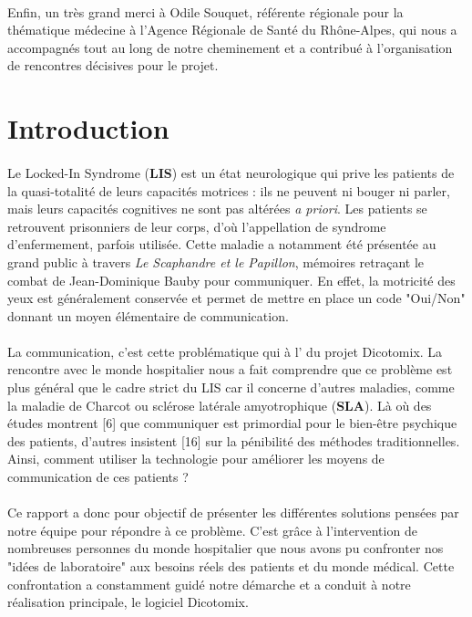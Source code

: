 \documentclass[11pt,a4paper]{article}
\theoremstyle{plain}
\theoremstyle{definition}
\begin{document}
\paragraph{}Enfin, un très grand merci à Odile Souquet, référente régionale pour la thématique médecine à l'Agence Régionale de Santé du Rhône-Alpes, qui nous a accompagnés tout au long de notre cheminement et a contribué à l'organisation de rencontres décisives pour le projet.

\newpage

\tableofcontents

\newpage
\section{Introduction}

\paragraph{} Le Locked-In Syndrome (\textbf{LIS}) est un état neurologique qui prive les patients de la quasi-totalité de leurs capacités motrices : ils ne peuvent ni bouger ni parler,
mais leurs capacités cognitives ne sont pas altérées \textit{a priori}. Les patients se retrouvent prisonniers de leur corps, d'où l'appellation de syndrome d'enfermement, parfois utilisée.
Cette maladie a notamment été présentée au grand public à travers \textit{Le Scaphandre et le Papillon}, mémoires retraçant le combat de Jean-Dominique Bauby pour communiquer. 
En effet, la motricité des yeux est généralement conservée et permet de mettre en place un code "Oui/Non" donnant un moyen élémentaire de communication.

\paragraph{} La communication, c'est cette problématique qui à l' du projet Dicotomix. La rencontre avec le monde hospitalier nous a fait comprendre que ce problème est plus général 
que le cadre strict du LIS car il concerne d'autres maladies, comme la maladie de Charcot ou sclérose latérale amyotrophique (\textbf{SLA}). Là où des études montrent [6] que communiquer est primordial pour le bien-être psychique des patients, d'autres insistent [16] sur la pénibilité des méthodes traditionnelles. Ainsi, comment utiliser la technologie pour améliorer les moyens de communication de ces patients ? 

\paragraph{} Ce rapport a donc pour objectif de présenter les différentes solutions pensées par notre équipe pour répondre à ce problème. C'est grâce à l'intervention de nombreuses personnes du monde hospitalier que 
nous avons pu confronter nos "idées de laboratoire" aux besoins réels des patients et du monde médical. Cette confrontation a constamment guidé notre démarche et a conduit à notre réalisation principale, le logiciel Dicotomix.
\end{document}
